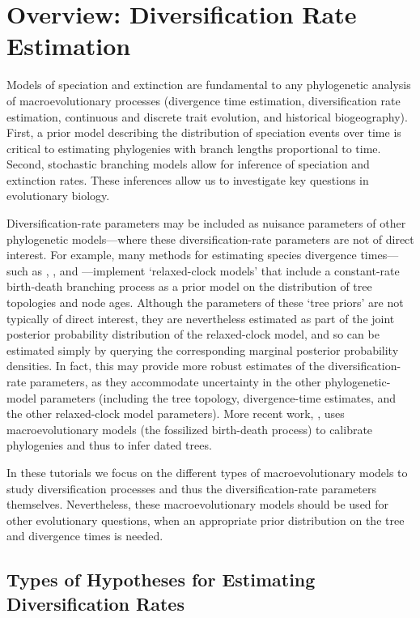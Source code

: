 \section{Overview: Diversification Rate Estimation}

Models of speciation and extinction are fundamental to any phylogenetic analysis of macroevolutionary processes (\EG divergence time estimation, diversification rate estimation, continuous and discrete trait evolution, and historical biogeography).
First, a prior model describing the distribution of speciation events over time is critical to estimating phylogenies with branch lengths proportional to time.
Second, stochastic branching models allow for inference of speciation and extinction rates.
These inferences allow us to investigate key questions in evolutionary biology.

Diversification-rate parameters may be included as nuisance parameters of other phylogenetic models---\IE where these diversification-rate parameters are not of direct interest.
For example, many methods for estimating species divergence times---such as \BEAST \citep{Drummond2012}, \MrBayes \citep{Ronquist2012}, and \RevBayes \citep{Hoehna2016b}---implement `relaxed-clock models' that include a constant-rate birth-death branching process as a prior model on the distribution of tree topologies and node ages.
Although the parameters of these `tree priors' are not typically of direct interest, they are nevertheless estimated as part of the joint posterior probability distribution of the relaxed-clock model, and so can be estimated simply by querying the corresponding marginal posterior probability densities.
In fact, this may provide more robust estimates of the diversification-rate parameters, as they accommodate uncertainty in the other phylogenetic-model parameters (including the tree topology, divergence-time estimates, and the other relaxed-clock model parameters).
More recent work, \EG \cite{Heath2014}, uses macroevolutionary models (the fossilized birth-death process) to calibrate phylogenies and thus to infer dated trees.

In these tutorials we focus on the different types of macroevolutionary models to study diversification processes and thus the diversification-rate parameters themselves.
Nevertheless, these macroevolutionary models should be used for other evolutionary questions, when an appropriate prior distribution on the tree and divergence times is needed.


\subsection{Types of Hypotheses for Estimating Diversification Rates}

